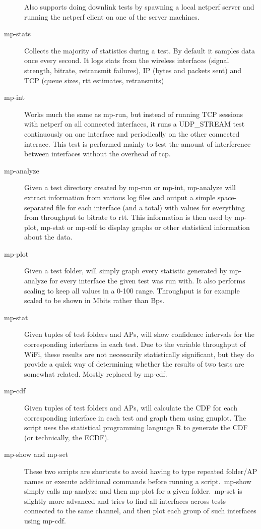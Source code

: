 \documentclass[12pt,a4paper]{article}
\begin{document}
\begin{description}
    Also supports doing downlink tests by spawning a local netperf server and
    running the netperf client on one of the server machines.
  \item[mp-stats]
    Collects the majority of statistics during a test. By default it samples
    data once every second. It logs stats from the wireless interfaces (signal
    strength, bitrate, retransmit failures), IP (bytes and packets sent) and TCP
    (queue sizes, rtt estimates, retransmits)
  \item[mp-int]
    Works much the same as mp-run, but instead of running TCP sessions with
    netperf on all connected interfaces, it runs a UDP\_STREAM test continuously
    on one interface and periodically on the other connected interace. This test
    is performed mainly to test the amount of interference between interfaces
    without the overhead of tcp.
  \item[mp-analyze]
    Given a test directory created by mp-run or mp-int, mp-analyze will extract
    information from various log files and output a simple space-separated file
    for each interface (and a total) with values for everything from throughput
    to bitrate to rtt. This information is then used by mp-plot, mp-stat or
    mp-cdf to display graphs or other statistical information about the data.
  \item[mp-plot]
    Given a test folder, will simply graph every statistic generated by
    mp-analyze for every interface the given test was run with. It also performs
    scaling to keep all values in a 0-100 range. Throughput is for example
    scaled to be shown in Mbits rather than Bps.
  \item[mp-stat]
    Given tuples of test folders and APs, will show confidence intervals for the
    corresponding interfaces in each test. Due to the variable throughput of
    WiFi, these results are not necessarily statistically significant, but they
    do provide a quick way of determining whether the results of two tests are
    somewhat related. Mostly replaced by mp-cdf.
  \item[mp-cdf]
    Given tuples of test folders and APs, will calculate the CDF for each
    corresponding interface in each test and graph them using gnuplot. The
    script uses the statistical programming language R to generate the CDF (or
    technically, the ECDF).
  \item[mp-show and mp-set]
    These two scripts are shortcuts to avoid having to type repeated folder/AP
    names or execute additional commands before running a script.\ mp-show
    simply calls mp-analyze and then mp-plot for a given folder.\ mp-set is
    slightly more advanced and tries to find all interfaces across tests
    connected to the same channel, and then plot each group of such interfaces
    using mp-cdf.
\end{description}
\end{document}
